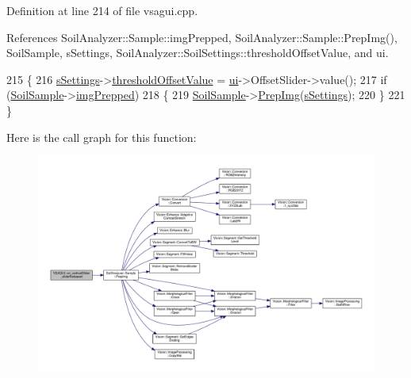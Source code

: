 Definition at line 214 of file vsagui.\+cpp.



References Soil\+Analyzer\+::\+Sample\+::img\+Prepped, Soil\+Analyzer\+::\+Sample\+::\+Prep\+Img(), Soil\+Sample, s\+Settings, Soil\+Analyzer\+::\+Soil\+Settings\+::threshold\+Offset\+Value, and ui.


\begin{DoxyCode}
215 \{
216     \hyperlink{class_v_s_a_g_u_i_a4a0358d00aa3cb520a9a1321962b0d4d}{sSettings}->\hyperlink{class_soil_analyzer_1_1_soil_settings_a48330eb812672b50a94483f264614e8f}{thresholdOffsetValue} = \hyperlink{class_v_s_a_g_u_i_a7a1d0cb3cf813ff9dce12f7f0ed6cd7a}{ui}->OffsetSlider->value();
217     \textcolor{keywordflow}{if} (\hyperlink{class_v_s_a_g_u_i_ac90517c9baea0a75455d43d5eb77d3e7}{SoilSample}->\hyperlink{class_soil_analyzer_1_1_sample_ab025a26f7276128a5a974cae15b51dfc}{imgPrepped})
218     \{
219         \hyperlink{class_v_s_a_g_u_i_ac90517c9baea0a75455d43d5eb77d3e7}{SoilSample}->\hyperlink{class_soil_analyzer_1_1_sample_a23050a1fff3e11e907657623756333b2}{PrepImg}(\hyperlink{class_v_s_a_g_u_i_a4a0358d00aa3cb520a9a1321962b0d4d}{sSettings});
220     \}
221 \}
\end{DoxyCode}


Here is the call graph for this function\+:\nopagebreak
\begin{figure}[H]
\begin{center}
\leavevmode
\includegraphics[width=350pt]{class_v_s_a_g_u_i_a161ef77cd94b239874ea35079aec9eb4_cgraph}
\end{center}
\end{figure}


\hypertarget{class_v_s_a_g_u_i_a8a5092f741e17c73b04850a6b30dda04}{}
